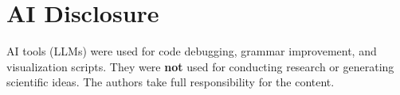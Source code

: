 \documentclass{article}
\theoremstyle{plain}
\theoremstyle{definition}
\theoremstyle{remark}
\begin{document}
\section*{AI Disclosure}
AI tools (LLMs) were used for code debugging, grammar improvement, and visualization scripts. They were \textbf{not} used for conducting research or generating scientific ideas. The authors take full responsibility for the content.








\newpage
\appendix
\end{document}
